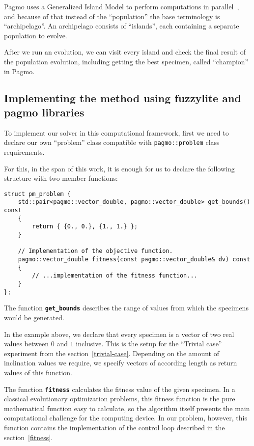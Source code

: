 \documentclass[12pt, a4paper]{article}
\begin{document}
	Pagmo uses a Generalized Island Model to perform computations in parallel~\cite{Izzo2012}, and because of that instead of the ``population'' the base terminology is ``archipelago''.
	An archipelago consists of ``islands'', each containing a separate population to evolve.
	
	After we run an evolution, we can visit every island and check the final result of the population evolution, including getting the best specimen, called ``champion'' in Pagmo.
	
	\subsection{Implementing the method using fuzzylite and pagmo libraries}\label{section::implementation}
	
	To implement our solver in this computational framework, first we need to declare our own ``problem'' class compatible with \texttt{pagmo::problem} class requirements.
	
	For this, in the span of this work, it is enough for us to declare the following structure with two member functions:
	
	\begin{lstlisting}[language={[11]c++}]
struct pm_problem {
	std::pair<pagmo::vector_double, pagmo::vector_double> get_bounds() const
	{
		return { {0., 0.}, {1., 1.} };
	}
	
	// Implementation of the objective function.
	pagmo::vector_double fitness(const pagmo::vector_double& dv) const
	{
		// ...implementation of the fitness function...
	}
};
	\end{lstlisting}
	
	The function \textbf{\texttt{get\_bounds}} describes the range of values from which the specimens would be generated.
	
	In the example above, we declare that every specimen is a vector of two real values between $0$ and $1$ inclusive.
	This is the setup for the ``Trivial case'' experiment from the section~\ref{trivial-case}.
	Depending on the amount of inclination values we require, we specify vectors of according length as return values of this function.
	
	The function \textbf{\texttt{fitness}} calculates the fitness value of the given specimen.
	In a classical evolutionary optimization problems, this fitness function is the pure mathematical function easy to calculate, so the algorithm itself presents the main computational challenge for the computing device.
	In our problem, however, this function contains the implementation of the control loop described in the section~\ref{fitness}.
	
\end{document}
